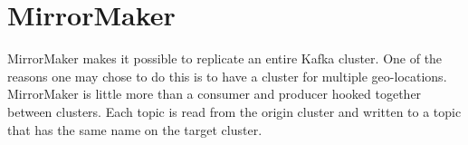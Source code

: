 \section{MirrorMaker}

MirrorMaker makes it possible to replicate an entire Kafka cluster. One of the reasons one may chose to do this is to have a cluster for multiple geo-locations. MirrorMaker is little more than a consumer and producer hooked together between clusters. Each topic is read from the origin cluster and written to a topic that has the same name on the target cluster.